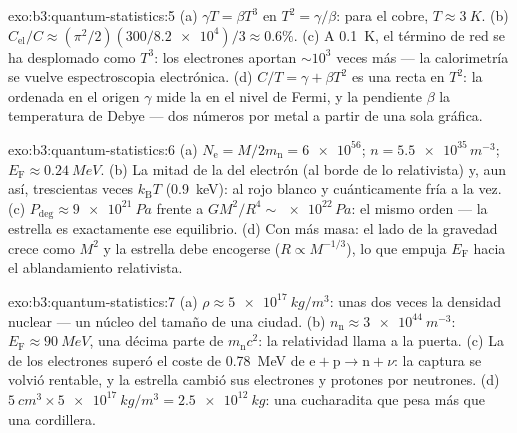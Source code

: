 \begin{solution}{exo:b3:quantum-statistics:5}
(a) $\gamma T = \beta T^3$ en $T^2 = \gamma/\beta$: para el cobre,
$T \approx \qty{3}{K}$. (b) $C_{\text{el}}/C \approx
(\pi^2/2)(300/\num{8.2e4})/3 \approx 0.6\%$. (c) A \qty{0.1}{K},
el término de red se ha desplomado como $T^3$: los electrones aportan
$\sim10^3$ veces más --- la calorimetría se vuelve espectroscopia
electrónica. (d) $C/T = \gamma + \beta T^2$ es una recta en
$T^2$: la ordenada en el origen $\gamma$ mide la  en el
nivel de Fermi, y la pendiente $\beta$ la temperatura de Debye --- dos números
por metal a partir de una sola gráfica.
\end{solution}

\begin{solution}{exo:b3:quantum-statistics:6}
(a) $N_{\text{e}} = M/2m_{\text{n}} = \num{6e56}$; $n =
\num{5.5e35}\,\unit{m^{-3}}$; $E_{\text{F}} \approx
\qty{0.24}{MeV}$. (b) La mitad de la  del electrón (al borde
de lo relativista) y, aun así, trescientas veces $k_{\text{B}}T$
(\qty{0.9}{keV}): al rojo blanco y cuánticamente fría a la vez. (c)
$P_{\text{deg}} \approx \qty{9e21}{Pa}$ frente a $GM^2/R^4 \sim
\num{e22}\,\unit{Pa}$: el mismo orden --- la estrella es exactamente ese
equilibrio. (d) Con más masa: el lado de la gravedad crece como $M^2$ y la
estrella debe encogerse ($R \propto M^{-1/3}$), lo que empuja $E_{\text{F}}$
hacia el ablandamiento relativista.
\end{solution}

\begin{solution}{exo:b3:quantum-statistics:7}
(a) $\rho \approx \qty{5e17}{kg/m^3}$: unas dos veces la densidad
nuclear --- un núcleo del tamaño de una ciudad. (b) $n_{\text{n}}
\approx \qty{3e44}{m^{-3}}$: $E_{\text{F}} \approx \qty{90}{MeV}$,
una décima parte de $m_{\text{n}}c^2$: la relatividad llama a la puerta. (c) La
 de los electrones superó el coste de \qty{0.78}{MeV} de
$\text{e} + \text{p} \to \text{n} + \nu$: la captura se volvió
rentable, y la estrella cambió sus electrones y protones por
neutrones. (d) $\qty{5}{cm^3} \times \qty{5e17}{kg/m^3} =
\qty{2.5e12}{kg}$: una cucharadita que pesa más que una cordillera.
\end{solution}

